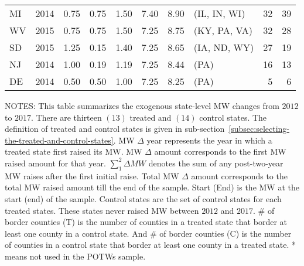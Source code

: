 \begin{table}[H]
{\begin{tabular}{lrrrrrrlrr}
            MI             & 2014             & 0.75               & 0.75                    & 1.50                     & 7.40     & 8.90   & (IL, IN, WI)   & 32                        & 39                        \\
            WV             & 2015             & 0.75               & 0.75                    & 1.50                     & 7.25     & 8.75   & (KY, PA, VA)   & 32                        & 28                        \\
            SD             & 2015             & 1.25               & 0.15                    & 1.40                     & 7.25     & 8.65   & (IA, ND, WY)   & 27                        & 19                        \\
            NJ             & 2014             & 1.00               & 0.19                    & 1.19                     & 7.25     & 8.44   & (PA)           & 16                        & 13                        \\
            DE             & 2014             & 0.50               & 0.50                    & 1.00                     & 7.25     & 8.25   & (PA)           & 5                         & 6                         \\ \bottomrule\bottomrule
        \end{tabular}
    }
    \begin{minipage}{17.5cm}
        \vspace{0.01in}
        \tiny NOTES: This table summarizes the exogenous state-level MW changes from $2012$ to $2017$. There are thirteen $(13)$ treated and $(14)$ control states. The definition of treated and control states is given in sub-section~\ref{subsec:selecting-the-treated-and-control-states}. MW $\Delta$ year represents the year in which a treated state first raised its MW. MW $\Delta$ amount corresponds to the first MW raised amount for that year. $\sum_{1}^{2}\Delta MW$ denotes the sum of any post-two-year MW raises after the first initial raise. Total MW $\Delta$ amount corresponds to the total MW raised amount till the end of the sample. Start (End) is the MW at the start (end) of the sample. Control states are the set of control states for each treated states. These states never raised MW between $2012$ and $2017$. \# of border counties (T) is the number of counties in a treated state that border at least one county in a control state. And \# of border counties (C) is the number of counties in a control state that border at least one county in a treated state. * means not used in the POTWs sample.
    \end{minipage}
\end{table}

